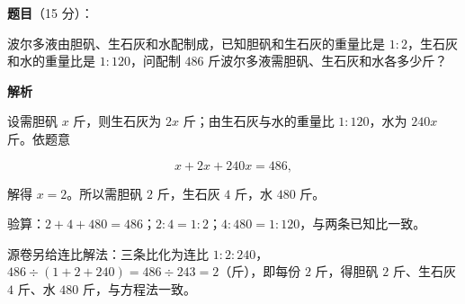 \begin{answer}

\textbf{题目}（15 分）：

波尔多液由胆矾、生石灰和水配制成，已知胆矾和生石灰的重量比是 $1:2$，生石灰和水的重量比是 $1:120$，问配制 $486$ 斤波尔多液需胆矾、生石灰和水各多少斤？

\textbf{解析}

设需胆矾 $x$ 斤，则生石灰为 $2x$ 斤；由生石灰与水的重量比 $1:120$，水为 $240x$ 斤。依题意

\nopagebreak[4]
\[
x+2x+240x=486,
\]

解得 $x=2$。所以需胆矾 $2$ 斤，生石灰 $4$ 斤，水 $480$ 斤。

验算：$2+4+480=486$；$2:4=1:2$；$4:480=1:120$，与两条已知比一致。

源卷另给连比解法：三条比化为连比 $1:2:240$，$486\div(1+2+240)=486\div243=2$（斤），即每份 $2$ 斤，得胆矾 $2$ 斤、生石灰 $4$ 斤、水 $480$ 斤，与方程法一致。


\end{answer}
